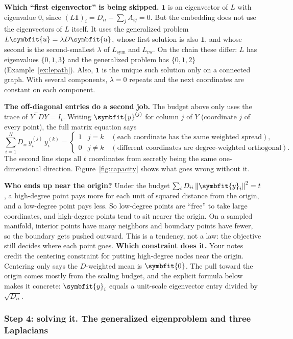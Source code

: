 \documentclass[11pt]{article}
\newcommand{\bm}[1]{\symbfit{#1}}
\newcommand{\vu}{\bm{u}}
\newcommand{\one}{\symbf{1}}
\newcommand{\T}{^{\mathsf T}}
\newcommand{\norm}[1]{\left\lVert #1\right\rVert}
\begin{document}
\textbf{Which ``first eigenvector'' is being skipped.} $\one$ is an eigenvector of $L$ with eigenvalue $0$, since $(L\one)_i=D_{ii}-\sum_jA_{ij}=0$. But the embedding does not use the eigenvectors of $L$ itself. It uses the generalized problem $L\vu=\lambda D\vu$, whose first solution is also $\one$, and whose second is the second-smallest $\lambda$ of $L_{\mathrm{sym}}$ and $L_{\mathrm{rw}}$. On the chain these differ: $L$ has eigenvalues $\{0,1,3\}$ and the generalized problem has $\{0,1,2\}$ (Example~\ref{ex:lepath}). Also, $\one$ is the unique such solution only on a connected graph. With several components, $\lambda=0$ repeats and the next coordinates are constant on each component.

\textbf{The off-diagonal entries do a second job.} The budget above only uses the trace of $Y\T DY=I_t$. Writing $\bm y^{(j)}$ for column $j$ of $Y$ (coordinate $j$ of every point), the full matrix equation says
\[
\sum_{i=1}^ND_{ii}\,y^{(j)}_i\,y^{(k)}_i=\begin{cases}1 & j=k\quad(\text{each coordinate has the same weighted spread}),\\ 0 & j\ne k\quad(\text{different coordinates are degree-weighted orthogonal}).\end{cases}
\]
The second line stops all $t$ coordinates from secretly being the same one-dimensional direction. Figure~\ref{fig:capacity} shows what goes wrong without it.

\begin{intuition}
\textbf{Who ends up near the origin?} Under the budget $\sum_iD_{ii}\norm{\bm y_i}^2=t$, a high-degree point pays more for each unit of squared distance from the origin, and a
low-degree point pays less. So low-degree points are ``free'' to take large coordinates, and high-degree points tend to sit nearer the origin.
On a sampled manifold, interior points have many neighbors and boundary points have fewer, so the boundary gets pushed outward.
This is a tendency, not a law: the objective still decides where each point goes.
\textbf{Which constraint does it.} Your notes credit the centering constraint for putting high-degree nodes near the origin. Centering only
says the $D$-weighted mean is $\bm 0$. The pull toward the origin comes mostly from the scaling budget, and the explicit formula below makes it
concrete: $\bm y_i$ equals a unit-scale eigenvector entry divided by $\sqrt{D_{ii}}$.
\end{intuition}

\subsubsection*{Step 4: solving it. The generalized eigenproblem and three Laplacians}
\end{document}
